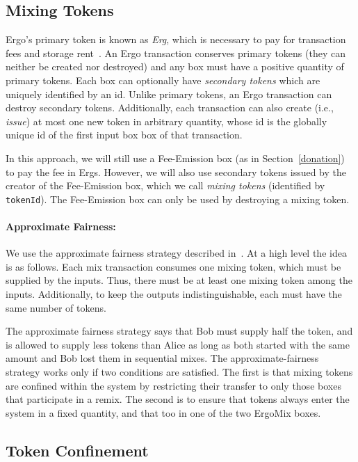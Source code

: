 \documentclass[runningheads]{llncs}
\newcommand{\mixname}{ErgoMix\xspace}
\begin{document}
\subsection{Mixing Tokens}

Ergo's primary token is known as {\em Erg}, which is necessary to pay for transaction fees and storage rent~\cite{chepurnoy2018systematic}. An Ergo transaction conserves primary tokens (they can neither be created nor destroyed) and any box must have a positive quantity of primary tokens.
Each box can optionally have {\em secondary tokens} which are uniquely identified by an id. Unlike primary tokens, an Ergo transaction can destroy secondary tokens. Additionally, each transaction can also create (i.e., {\em issue}) at most one new token in arbitrary quantity, whose id is the globally unique id of the first input box box of that transaction. 

In this approach, we will still use a Fee-Emission box (as in Section~\ref{donation}) to pay the fee in Ergs. However, we will also use secondary tokens issued by the creator of the Fee-Emission box, which we call {\em mixing tokens} (identified by \texttt{tokenId}). The Fee-Emission box can only be used by destroying a mixing token.

\paragraph{Approximate Fairness:} We use the approximate fairness strategy described in~\cite{advtutorial}. At a high level the idea is as follows.
Each mix transaction consumes one mixing token, which must be supplied by the inputs. Thus, there must be at least one mixing token among the inputs. Additionally, to keep the outputs indistinguishable, each must have the same number of tokens. 

The approximate fairness strategy says that Bob must supply half the token, and is allowed to supply less tokens than Alice as long as both started with the same amount and Bob lost them in sequential mixes.
The approximate-fairness strategy works only if two conditions are satisfied. The first is that mixing tokens are confined within the system by restricting their transfer to only those boxes that participate in a remix. 
The second is to ensure that tokens always enter the system in a fixed quantity, and that too in one of the two \mixname boxes. 

\subsection{Token Confinement}
\end{document}
